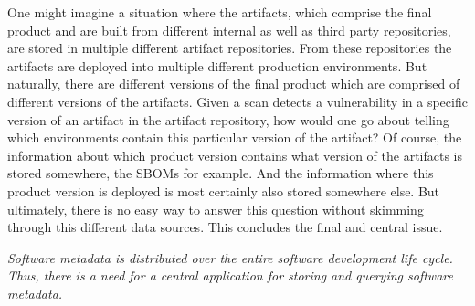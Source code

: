 One might imagine a situation where the artifacts, which comprise the final product and are built from different internal as well as third party repositories, are stored in multiple different artifact repositories. From these repositories the artifacts are deployed into multiple different production environments. But naturally, there are different versions of the final product which are comprised of different versions of the artifacts. Given a scan detects a vulnerability in a specific version of an artifact in the artifact repository, how would one go about telling which environments contain this particular version of the artifact? Of course, the information about which product version contains what version of the artifacts is stored somewhere, the SBOMs for example. And the information where this product version is deployed is most certainly also stored somewhere else. But ultimately, there is no easy way to answer this question without skimming through this different data sources. This concludes the final and central issue.\par
\emph{Software metadata is distributed over the entire software development life cycle. Thus, there is a need for a central application for storing and querying software metadata.}